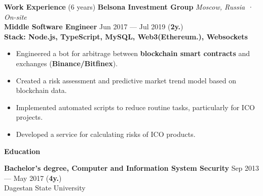 \documentclass{resume}
\begin{document}
\begin{rSection}{\textbf{Work Experience} (6 years) }
\textbf{Belsona Investment Group} \hfill \textit{Moscow, Russia · On-site} \\
\textbf{Middle Software Engineer}  \hfill Jun 2017 --- Jul 2019 ({\textbf{2y.}}) \\
\textbf{Stack: Node.js, TypeScript, MySQL, Web3(Ethereum.), Websockets}
\begin{itemize}
    \item Engineered a bot for arbitrage between \textbf{blockchain smart contracts} and exchanges (\textbf{Binance/Bitfinex})\@.
    \item Created a risk assessment and predictive market trend model based on blockchain data\@.
    \item Implemented automated scripts to reduce routine tasks, particularly for ICO projects\@.
    \item Developed a service for calculating risks of ICO products\@.
\end{itemize}

\end{rSection}



\begin{rSection}{\textbf{Education}}

\textbf{Bachelor's degree, Computer and Information System Security} \hfill {Sep 2013 --- May 2017 ({\textbf{4y.}})} \\
	  Dagestan State University

\end{rSection}
\end{document}
